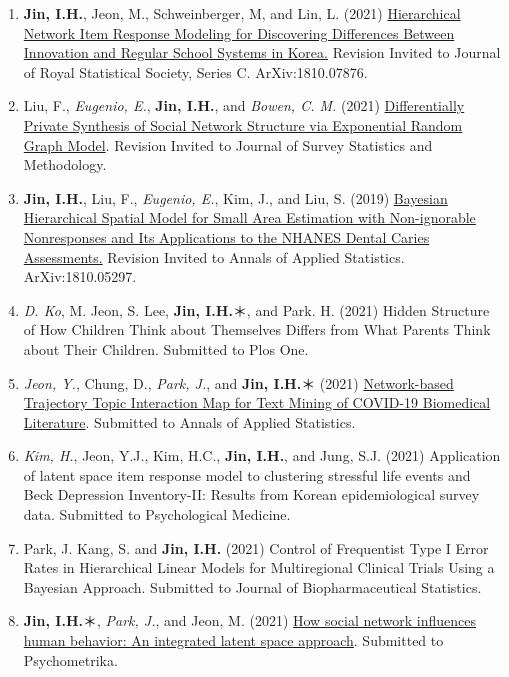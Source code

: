 \documentclass[
]{book}
\begin{document}
\begin{enumerate}
\def\labelenumi{\arabic{enumi}.}
\item
  \textbf{Jin, I.H.}, Jeon, M., Schweinberger, M, and Lin, L. (2021) \href{https://arxiv.org/abs/1810.07876}{Hierarchical Network Item Response Modeling for Discovering Differences Between Innovation and Regular School Systems in Korea.} Revision Invited to Journal of Royal Statistical Society, Series C. ArXiv:1810.07876.
\item
  Liu, F., \emph{Eugenio, E.}, \textbf{Jin, I.H.}, and \emph{Bowen, C. M.} (2021) \href{https://www.osti.gov/biblio/1668697}{Differentially Private Synthesis of Social Network Structure via Exponential Random Graph Model}. Revision Invited to Journal of Survey Statistics and Methodology.
\item
  \textbf{Jin, I.H.}, Liu, F., \emph{Eugenio, E.}, Kim, J., and Liu, S. (2019) \href{https://arxiv.org/abs/1810.05297}{Bayesian Hierarchical Spatial Model for Small Area Estimation with Non-ignorable Nonresponses and Its Applications to the NHANES Dental Caries Assessments.} Revision Invited to Annals of Applied Statistics. ArXiv:1810.05297.
\item
  \emph{D. Ko}, M. Jeon, S. Lee, \textbf{Jin, I.H.}＊, and Park. H. (2021) Hidden Structure of How Children Think about Themselves Differs from What Parents Think about Their Children. Submitted to Plos One.
\item
  \emph{Jeon, Y.}, Chung, D., \emph{Park, J.}, and \textbf{Jin, I.H.}＊ (2021) \href{https://arxiv.org/abs/2106.07374}{Network-based Trajectory Topic Interaction Map for Text Mining of COVID-19 Biomedical Literature}. Submitted to Annals of Applied Statistics.
\item
  \emph{Kim, H.}, Jeon, Y.J., Kim, H.C., \textbf{Jin, I.H.}, and Jung, S.J. (2021) Application of latent space item response model to clustering stressful life events and Beck Depression Inventory-II: Results from Korean epidemiological survey data. Submitted to Psychological Medicine.
\item
  Park, J. Kang, S. and \textbf{Jin, I.H.} (2021) Control of Frequentist Type I Error Rates in Hierarchical Linear Models for Multiregional Clinical Trials Using a Bayesian Approach. Submitted to Journal of Biopharmaceutical Statistics.
\item
  \textbf{Jin, I.H.}＊, \emph{Park, J.}, and Jeon, M. (2021) \href{https://arxiv.org/abs/2109.05200}{How social network influences human behavior: An integrated latent space approach}. Submitted to Psychometrika.
\end{enumerate}
\end{document}
